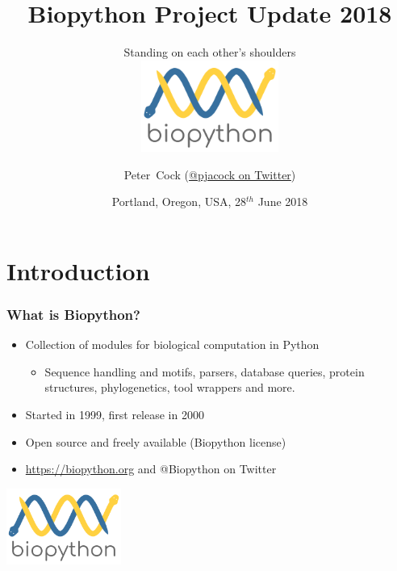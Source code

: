 

\usepackage{multicol}

\title[Biopython Project Update 2018] %
{Biopython Project Update 2018}
\subtitle{Standing on each other's shoulders \\ \includegraphics[height=3cm]{images/biopython_logo_m.png}}
\author[Cock] %
{Peter~Cock (\href{https://twitter.com/pjacock}{@pjacock on Twitter})}
\date[June 2018] %
{Portland, Oregon, USA, 28$^{th}$ June 2018}
\subject{Bioinformatics}





\frame[plain]{\titlepage}

\section{Introduction}

\begin{frame}
  \frametitle{What is Biopython?}

  \begin{itemize}
  \item Collection of modules for biological computation in Python
  \begin{itemize}
  \item Sequence handling and motifs, parsers, database queries, protein structures, phylogenetics, tool wrappers and more.
  \end{itemize}
  \item Started in 1999, first release in 2000
  \item Open source and freely available (Biopython license)
  \item \url{https://biopython.org} and @Biopython on Twitter
  \end{itemize}

\center
\includegraphics[height=2.5cm]{images/biopython_logo_m.png}

\end{frame}

